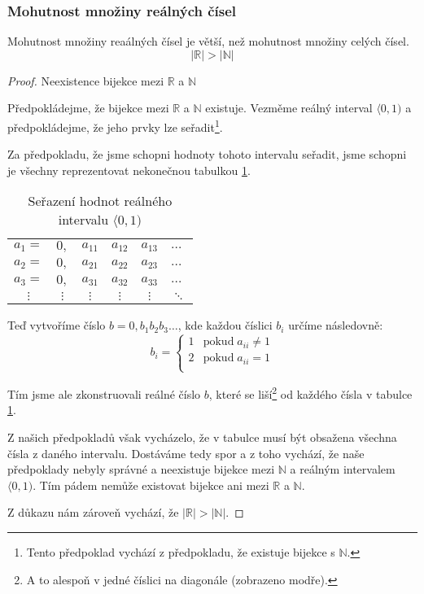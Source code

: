 \subsubsection*{Mohutnost množiny reálných čísel}
Mohutnost množiny reaálných čísel je větší, než mohutnost množiny celých čísel.
$$|\mathbb{R}| > |\mathbb{N}|$$
\begin{proof}
    Neexistence bijekce mezi $\mathbb{R}$ a $\mathbb{N}$

    Předpokládejme, že bijekce mezi $\mathbb{R}$ a $\mathbb{N}$ existuje.
    Vezměme reálný interval $\langle0, 1)$ a předpokládejme, že jeho prvky lze seřadit\footnote{Tento
    předpoklad vychází z předpokladu, že existuje bijekce s $\mathbb{N}$.}.

    Za předpokladu, že jsme schopni hodnoty tohoto intervalu seřadit, jsme schopni
    je všechny reprezentovat nekonečnou tabulkou \ref{tab:diag_real}.


\begin{table}[]
    \centering
    \begin{tabular}{cccccl}
    $a_1 = $ & $0,$     & \cellcolor[HTML]{3166FF}$a_{11}$ & $a_{12}$                         & $a_{13}$                         & $\dots$  \\
    $a_2 = $ & $0,$     & $a_{21}$                         & \cellcolor[HTML]{3166FF}$a_{22}$ & $a_{23}$                         & $\dots$  \\
    $a_3 = $ & $0,$     & $a_{31}$                         & $a_{32}$                         & \cellcolor[HTML]{3166FF}$a_{33}$ & $\dots$  \\
    $\vdots$ & $\vdots$ & $\vdots$                         & $\vdots$                         & $\vdots$                         & $\ddots$
    \end{tabular}
    \caption{Seřazení hodnot reálného intervalu $\langle 0, 1)$}
    \label{tab:diag_real}
\end{table}

    Teď vytvoříme číslo $b = 0,b_1 b_2 b_3 \ldots$, kde každou číslici $b_i$ určíme následovně:
    \[
    b_i =
    \left\{
    \begin{array}{ll}
        1 & \text{pokud} \; a_{ii} \neq 1\\
        2 & \text{pokud} \; a_{ii} = 1   \\
    \end{array}
    \right.
\]

    Tím jsme ale zkonstruovali reálné číslo $b$, které se liší\footnote{A to alespoň v
    jedné číslici na diagonále (zobrazeno modře).} od každého čísla v tabulce
    \ref{tab:diag_real}.

    Z našich předpokladů však vycházelo, že v tabulce musí být obsažena všechna čísla z daného
    intervalu. Dostáváme tedy spor a z toho vychází, že naše předpoklady nebyly správné a
    neexistuje bijekce mezi $\mathbb{N}$ a reálným intervalem $\langle 0, 1)$. Tím pádem nemůže
    existovat bijekce ani mezi $\mathbb{R}$ a $\mathbb{N}$.

    Z důkazu nám zároveň vychází, že $|\mathbb{R}| > |\mathbb{N}|$.
\end{proof}

